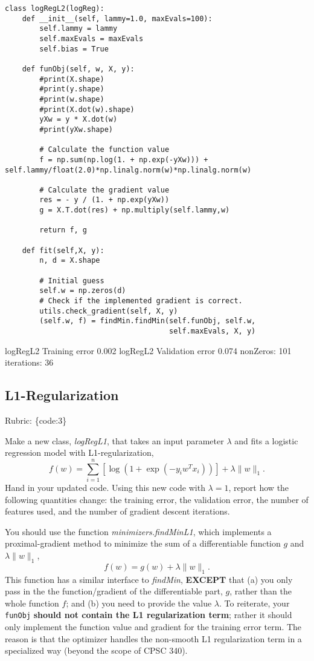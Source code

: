 \documentclass{article}
\def\rubric#1{\gre{Rubric: \{#1\}}}{}
\def\blu#1{{\color{blu}#1}}
\def\gre#1{{\color{gre}#1}}
\def\red#1{{\color{red}#1}}
\def\norm#1{\|#1\|}
\begin{document}
\begin{lstlisting}
class logRegL2(logReg):
    def __init__(self, lammy=1.0, maxEvals=100):
        self.lammy = lammy
        self.maxEvals = maxEvals
        self.bias = True

    def funObj(self, w, X, y):
        #print(X.shape)
        #print(y.shape)
        #print(w.shape)
        #print(X.dot(w).shape)
        yXw = y * X.dot(w)
        #print(yXw.shape)

        # Calculate the function value
        f = np.sum(np.log(1. + np.exp(-yXw))) + self.lammy/float(2.0)*np.linalg.norm(w)*np.linalg.norm(w)

        # Calculate the gradient value
        res = - y / (1. + np.exp(yXw))
        g = X.T.dot(res) + np.multiply(self.lammy,w)

        return f, g

    def fit(self,X, y):
        n, d = X.shape

        # Initial guess
        self.w = np.zeros(d)
        # Check if the implemented gradient is correct.
        utils.check_gradient(self, X, y)
        (self.w, f) = findMin.findMin(self.funObj, self.w,
                                      self.maxEvals, X, y)
\end{lstlisting}

\red{
logRegL2 Training error 0.002 \newline
logRegL2 Validation error 0.074 \newline
nonZeros: 101 \newline
iterations: 36
}


\subsection{L1-Regularization}
\rubric{code:3}

Make a new class, \emph{logRegL1}, that takes an input parameter $\lambda$ and fits a logistic regression model with L1-regularization,
\[
f(w) = \sum_{i=1}^n \left[\log(1+\exp(-y_iw^Tx_i))\right] + \lambda\norm{w}_1.
\]
\blu{Hand in your updated code. Using this new code with $\lambda = 1$, report how the following quantities change: the training error, the validation error, the number of features used, and the number of gradient descent iterations.}


You should use the function \emph{minimizers.findMinL1}, which implements a
proximal-gradient method to minimize the sum of a differentiable function $g$ and $\lambda\norm{w}_1$,
\[
f(w) = g(w) + \lambda \norm{w}_1.
\]
This function has a similar interface to \emph{findMin}, \textbf{EXCEPT} that (a) you
only pass in the the function/gradient of the differentiable
part, $g$, rather than the whole function $f$; and (b) you need to provide the value $\lambda$.
To reiterate, your \texttt{funObj} \textbf{should not contain the L1 regularization term}; rather it
should only implement the function value and gradient for the training error term. The reason is that 
the optimizer handles the non-smooth L1 regularization term in a specialized way (beyond the scope of CPSC 340).
\end{document}
